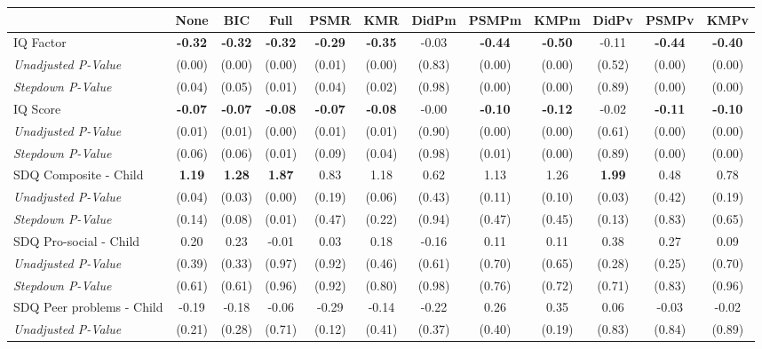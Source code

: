 \begin{tabular}{l c c c c c c c c c c c}
\toprule
 & None & BIC & Full & PSMR & KMR & DidPm & PSMPm & KMPm & DidPv & PSMPv & KMPv \\
\midrule
IQ Factor & \textbf{ -0.32 } & \textbf{ -0.32 } & \textbf{ -0.32 } & \textbf{ -0.29 } & \textbf{ -0.35 } & -0.03 & \textbf{ -0.44 } & \textbf{ -0.50 } & -0.11 & \textbf{ -0.44 } & \textbf{ -0.40 } \\
\quad \textit{Unadjusted P-Value} & (0.00) & (0.00) & (0.00) & (0.01) & (0.00) & (0.83) & (0.00) & (0.00) & (0.52) & (0.00) & (0.00) \\
\quad \textit{Stepdown P-Value} & (0.04) & (0.05) & (0.01) & (0.04) & (0.02) & (0.98) & (0.00) & (0.00) & (0.89) & (0.00) & (0.00) \\
IQ Score & \textbf{ -0.07 } & \textbf{ -0.07 } & \textbf{ -0.08 } & \textbf{ -0.07 } & \textbf{ -0.08 } & -0.00 & \textbf{ -0.10 } & \textbf{ -0.12 } & -0.02 & \textbf{ -0.11 } & \textbf{ -0.10 } \\
\quad \textit{Unadjusted P-Value} & (0.01) & (0.01) & (0.00) & (0.01) & (0.01) & (0.90) & (0.00) & (0.00) & (0.61) & (0.00) & (0.00) \\
\quad \textit{Stepdown P-Value} & (0.06) & (0.06) & (0.01) & (0.09) & (0.04) & (0.98) & (0.01) & (0.00) & (0.89) & (0.00) & (0.00) \\
SDQ Composite - Child & \textbf{ 1.19 } & \textbf{ 1.28 } & \textbf{ 1.87 } & 0.83 & 1.18 & 0.62 & 1.13 & 1.26 & \textbf{ 1.99 } & 0.48 & 0.78 \\
\quad \textit{Unadjusted P-Value} & (0.04) & (0.03) & (0.00) & (0.19) & (0.06) & (0.43) & (0.11) & (0.10) & (0.03) & (0.42) & (0.19) \\
\quad \textit{Stepdown P-Value} & (0.14) & (0.08) & (0.01) & (0.47) & (0.22) & (0.94) & (0.47) & (0.45) & (0.13) & (0.83) & (0.65) \\
SDQ Pro-social - Child & 0.20 & 0.23 & -0.01 & 0.03 & 0.18 & -0.16 & 0.11 & 0.11 & 0.38 & 0.27 & 0.09 \\
\quad \textit{Unadjusted P-Value} & (0.39) & (0.33) & (0.97) & (0.92) & (0.46) & (0.61) & (0.70) & (0.65) & (0.28) & (0.25) & (0.70) \\
\quad \textit{Stepdown P-Value} & (0.61) & (0.61) & (0.96) & (0.92) & (0.80) & (0.98) & (0.76) & (0.72) & (0.71) & (0.83) & (0.96) \\
SDQ Peer problems - Child & -0.19 & -0.18 & -0.06 & -0.29 & -0.14 & -0.22 & 0.26 & 0.35 & 0.06 & -0.03 & -0.02 \\
\quad \textit{Unadjusted P-Value} & (0.21) & (0.28) & (0.71) & (0.12) & (0.41) & (0.37) & (0.40) & (0.19) & (0.83) & (0.84) & (0.89) \\

\end{tabular}
